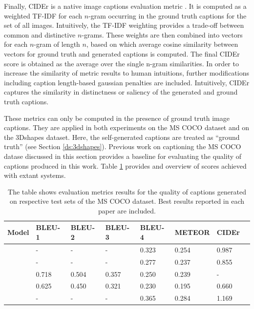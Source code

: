 Finally, CIDEr is a native image captions evaluation metric \parencite{vedantam2015cider}. It is computed as a weighted TF-IDF for each $n$-gram occurring in the ground truth captions for the set of all images. Intuitively, the TF-IDF weighting provides a trade-off between common and distinctive $n$-grams. These weights are then combined into vectors for each $n$-gram of length $n$, based on which average cosine similarity between vectors for ground truth and generated captions is computed. The final CIDEr score is obtained as the average over the single n-gram similarities. In order to increase the similarity of metric results to human intuitions, further modifications including caption length-based gaussian penalties are included. Intuitively, CIDEr captures the similarity in distinctness or saliency of the generated and ground truth captions.

These metrics can only be computed in the presence of ground truth image captions. They are applied in both experiments on the MS COCO dataset and on the 3Dshapes dataset. Here, the self-generated captions are treated as ``ground truth'' (see Section \ref{ds:3dshapes}).
Previous work on captioning the MS COCO datase discussed in this section provides a baseline for evaluating the quality of captions produced in this work. Table \ref{tab_coco_metrics_ref} provides and overview of scores achieved with extant systems.

\begin{table}[]
	\begin{tabularx}{\textwidth}{|X|l|l|l|l|l|l|l|}
		\hline
		Model                               & BLEU-1 & BLEU-2 & BLEU-3 & BLEU-4 & METEOR & CIDEr \\ \hline
		\cite{bengio2015scheduled}        & -      & -      & -      & 0.323   & 0.254  & 0.987 \\ \hline
		\cite{vinyals2015show}  & -      & -      & -      & 0.277    & 0.237  & 0.855 \\ \hline
		\cite{xu2015show} & 0.718  & 0.504  & 0.357  & 0.250     & 0.239  & -     \\ \hline
		\cite{karpathy2015deep}          & 0.625  & 0.450  & 0.321  & 0.230   & 0.195  & 0.660 \\ \hline
		\cite{zhou2019unified}          & -  & -  & -  & 0.365   & 0.284  & 1.169 \pt{?} \\ \hline
	\end{tabularx}
\caption{\label{tab_coco_metrics_ref}The table shows evaluation metrics results for the quality of captions generated on respective test sets of the MS COCO dataset. Best results reported in each paper are included.}
\end{table}


